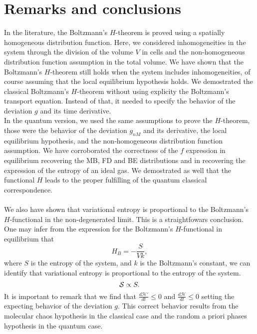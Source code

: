 \section{Remarks and conclusions}\label{sec:disscussion}

In the literature, the Boltzmann's $H$-theorem is proved using a spatially homogeneous distribution function. 
Here, we considered inhomogeneities in the system through the division of the volume $V$ in cells 
and the non-homogeneous distribution function assumption in the total volume. 
We have shown that the Boltzmann's $H$-theorem still holds when the system includes 
inhomogeneities, of course assuming that the local equilibrium hypothesis holds. 
We demostrated the classical Boltzmann's $H$-theorem without using explicity the Boltzmann's transport equation. 
Instead of that, it needed to specify the behavior of the deviation $g$ and its time derivative. 
\\
In the quantum version, we used the same assumptions to prove the $H$-theorem, those were the 
behavior of the deviation $g_{nM}$ and its derivative, the local equilibrium hypothesis, and the 
non-homogeneous distribution function assumption. 
We have corroborated the correctness of the $f$ expression in equilibrium recovering 
the MB, FD and BE distributions and in recovering the expression of the entropy of an ideal gas. 
We demostrated as well that the functional $H$ leads to the proper fulfilling of the quantum classical correspondence.
\\
\\
We also have shown that variational entropy is proportional to the Boltzmann's $H$-functional in the non-degenerated limit. 
This is a straightfowars conclusion. One may infer from the expression for the Boltzmann's $H$-functional in equilibrium that
\begin{equation}
    H_{B}=-\frac{S}{Vk},
\end{equation}
where $S$ is the entropy of the system, and $k$ is the Boltzmann's constant, we can identify that variational entropy is proportional to the entropy of the system.\\
\begin{equation}
    \mathcal{S}\propto S.
\end{equation}
It is important to remark that we find that $\frac{d\mathcal{H}'}{dt}\leq 0$ and $\frac{d\mathcal{H}}{dt}\leq 0$ 
setting the expecting behavior of the deviation $g$. 
This correct behavior results from the molecular chaos hypothesis in the classical case and 
the random a priori phases hypothesis in the quantum case. 
